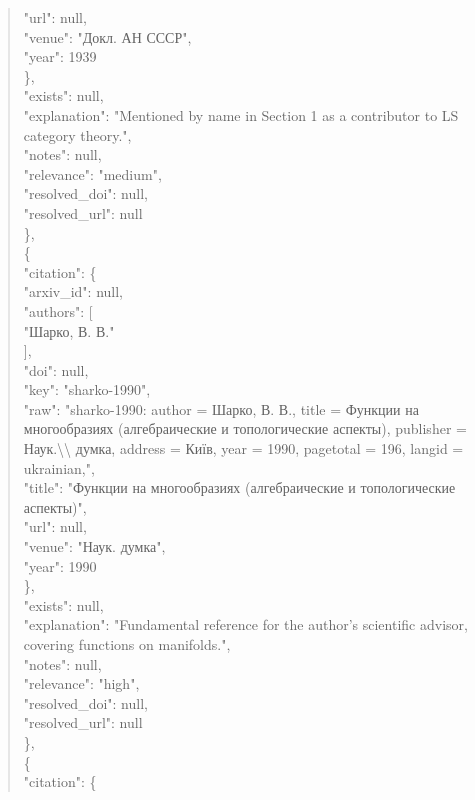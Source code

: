 \documentclass[11pt]{article}
\begin{document}
\begin{quote}
        "url": null,\\
        "venue": "Докл. АН СССР",\\
        "year": 1939\\
      \},\\
      "exists": null,\\
      "explanation": "Mentioned by name in Section 1 as a contributor to LS category theory.",\\
      "notes": null,\\
      "relevance": "medium",\\
      "resolved\_doi": null,\\
      "resolved\_url": null\\
    \},\\
    \{\\
      "citation": \{\\
        "arxiv\_id": null,\\
        "authors": [\\
          "Шарко, В. В."\\
        ],\\
        "doi": null,\\
        "key": "sharko-1990",\\
        "raw": "sharko-1990: author = Шарко, В. В., title = Функции на многообразиях (алгебраические и топологические аспекты), publisher = Наук.\textbackslash{}\textbackslash{} думка, address = Київ, year = 1990, pagetotal = 196, langid = ukrainian,",\\
        "title": "Функции на многообразиях (алгебраические и топологические аспекты)",\\
        "url": null,\\
        "venue": "Наук. думка",\\
        "year": 1990\\
      \},\\
      "exists": null,\\
      "explanation": "Fundamental reference for the author's scientific advisor, covering functions on manifolds.",\\
      "notes": null,\\
      "relevance": "high",\\
      "resolved\_doi": null,\\
      "resolved\_url": null\\
    \},\\
    \{\\
      "citation": \{\\

\end{quote}
\end{document}
